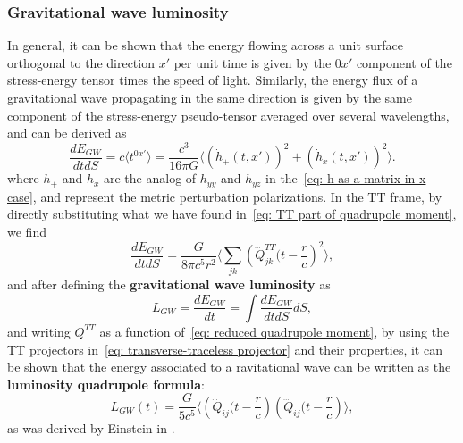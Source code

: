 \subsubsection{Gravitational wave luminosity}
In general, it can be shown that the energy flowing across a unit surface orthogonal to the direction $x'$ per unit time is given by the $0x'$ component of the stress-energy tensor times the speed of light.
Similarly, the energy flux of a gravitational wave propagating in the same direction is given by the same component of the stress-energy pseudo-tensor averaged over several wavelengths, and can be derived as
\[
    \frac{dE_{GW}}{dtdS} = c\langle t^{0x'}\rangle = \frac{c^3}{16\pi G}\langle (\dot{h}_+(t,x'))^2 + (\dot{h}_x(t,x'))^2 \rangle.
\]
where $h_+$ and $h_x$ are the analog of $h_{yy}$ and $h_{yz}$ in the~\eqref{eq: h as a matrix in x case}, and represent the metric perturbation polarizations.
In the TT frame, by directly substituting what we have found in~\eqref{eq: TT part of quadrupole moment}, we find 
\[
\frac{dE_{GW}}{dtdS} = \frac{G}{8\pi c^5 r^2}\Big\langle \sum_{jk}\left( \dddot{Q}_{jk}^{TT}(t-\frac{r}{c} \right)^2 \Big\rangle,
\]
and after defining the \textbf{gravitational wave luminosity} as
\[
    L_{GW} = \frac{dE_{GW}}{dt} = \int \frac{dE_{GW}}{dtdS}dS,
\]
and writing $Q^{TT}$ as a function of~\eqref{eq: reduced quadrupole moment}, by using the TT projectors in~\eqref{eq: transverse-traceless projector} and their properties, it can be shown that the energy associated to a ravitational wave can be written as the \textbf{luminosity quadrupole formula}:
\begin{equation}
    L_{GW}(t) = \frac{G}{5c^5}\Big\langle \left(\dddot{Q}_{ij}(t- \frac{r}{c}\right) \left(\dddot{Q}_{ij}(t-\frac{r}{c}\right) \Big\rangle,
    \label{eq: luminosity quadrupole formula}
\end{equation}
as was derived by Einstein in \cite{Einstein_1918}.

